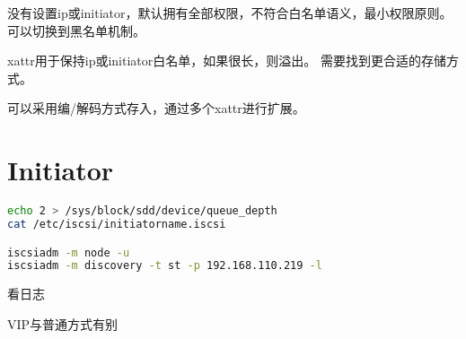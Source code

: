 没有设置ip或initiator，默认拥有全部权限，不符合白名单语义，最小权限原则。
可以切换到黑名单机制。

xattr用于保持ip或initiator白名单，如果很长，则溢出。
需要找到更合适的存储方式。

可以采用编/解码方式存入，通过多个xattr进行扩展。

\section{Initiator}

\begin{lstlisting}[language=bash,frame=single]
echo 2 > /sys/block/sdd/device/queue_depth
cat /etc/iscsi/initiatorname.iscsi

iscsiadm -m node -u
iscsiadm -m discovery -t st -p 192.168.110.219 -l
\end{lstlisting}

看日志

VIP与普通方式有别
